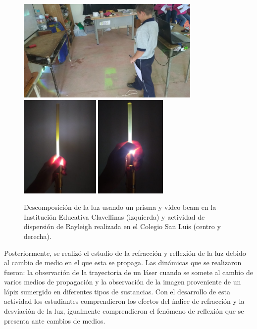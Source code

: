 \documentclass[a4paper,10pt]{article}
\begin{document}
\begin{figure}[H]
    \centering
    \includegraphics[height=5cm]{Imagenes/prismaclave.jpg}
    \includegraphics[height=5cm]{Imagenes/rayleigh1.jpeg}
    \includegraphics[height=5cm]{Imagenes/rayleigh2.jpeg}
    \caption{Descomposición de la luz usando un prisma y vídeo beam en la Institución Educativa Clavellinas (izquierda) y actividad de dispersión de Rayleigh realizada en el Colegio San Luis (centro y derecha).}
\end{figure}

\noindent Posteriormente, se realizó el estudio de la refracción y reflexión de la luz debido al cambio de medio en el que esta se propaga. Las dinámicas que se realizaron fueron: la observación de la trayectoria de un láser cuando se somete al cambio de varios medios de propagación y la observación de la imagen proveniente de un lápiz sumergido en diferentes tipos de sustancias. Con el desarrollo de esta actividad los estudiantes comprendieron los efectos del índice de refracción y la desviación de la luz, igualmente comprendieron el fenómeno de reflexión que se presenta ante cambios de medios.\\
\end{document}
